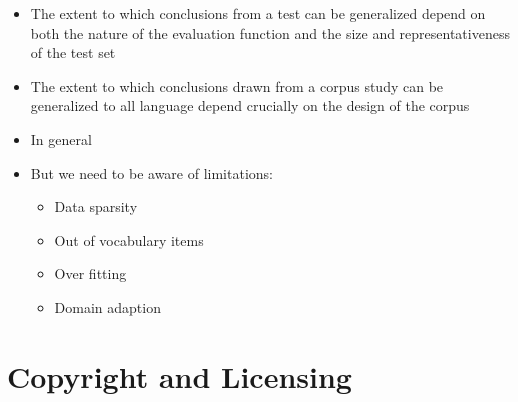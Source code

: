 \documentclass[a4paper,landscape,headrule,footrule,xetex]{foils}
\begin{document}
\begin{itemize}
\item The extent to which conclusions from a test can be generalized
  depend on both the nature of the evaluation function and the size
  and representativeness of the test set
\item The extent to which conclusions drawn from a corpus study can be
  generalized to all language depend crucially on the design of
  the corpus
\item In general 
\item But we need to be aware of limitations:
  \begin{itemize}
  \item Data sparsity
  \item Out of vocabulary items
  \item Over fitting
  \item Domain adaption
  \end{itemize}
\end{itemize}


\section{Copyright and Licensing}
\end{document}
